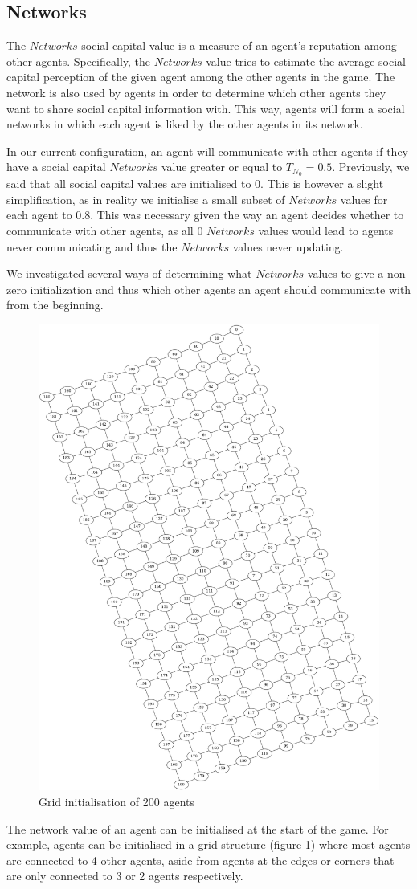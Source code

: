 \subsection{Networks}
The $Networks$ social capital value is a measure of an agent's reputation among other agents. Specifically, the $Networks$ value tries to estimate the average social capital perception of the given agent among the other agents in the game. The network is also used by agents in order to determine which other agents they want to share social capital information with. This way, agents will form a social networks in which each agent is liked by the other agents in its network.

In our current configuration, an agent will communicate with other agents if they have a social capital $Networks$ value greater or equal to $T_{N_0} = 0.5$. Previously, we said that all social capital values are initialised to 0. This is however a slight simplification, as in reality we initialise a small subset of $Networks$ values for each agent to 0.8. This was necessary given the way an agent decides whether to communicate with other agents, as all 0 $Networks$ values would lead to agents never communicating and thus the $Networks$ values never updating. 

We investigated several ways of determining what $Networks$ values to give a non-zero initialization and thus which other agents an agent should communicate with from the beginning.

\begin{figure}[!h]
    \centering
    \includegraphics[width=0.4\linewidth]{004_team_1_agent_design/images/sc_network_grid.png}
    \caption{Grid initialisation of 200 agents}
    \label{fig:sc_network_grid}
\end{figure}

The network value of an agent can be initialised at the start of the game. For example, agents can be initialised in a grid structure (figure \ref{fig:sc_network_grid}) where most agents are connected to 4 other agents, aside from agents at the edges or corners that are only connected to 3 or 2 agents respectively.

